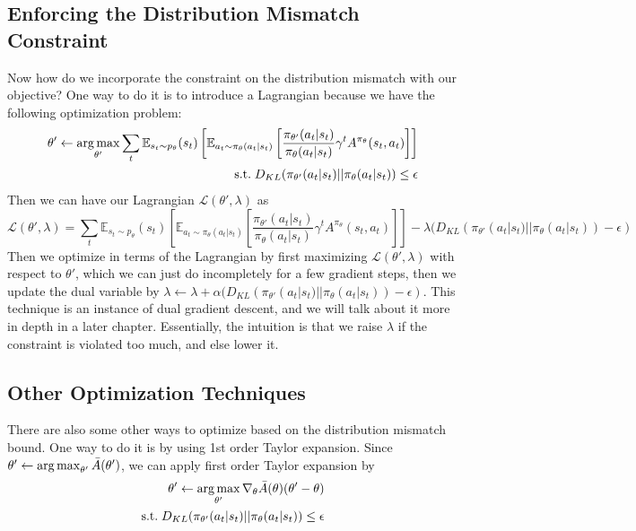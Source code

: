 \subsection{Enforcing the Distribution Mismatch Constraint}
Now how do we incorporate the constraint on the distribution mismatch with our objective? One way to do it is to introduce a Lagrangian because we have the following optimization problem:
\begin{equation}
\begin{aligned}
\theta'\leftarrow \operatorname*{arg\,max}_{\theta'} \sum_t \mathbb{E}_{s_t\sim p_{\theta}}(s_t)\left[\mathbb{E}_{a_t\sim \pi_\theta(a_t|s_t)}\left[\frac{\pi_{\theta'}(a_t|s_t)}{\pi_\theta(a_t|s_t)}\gamma^t A^{\pi_\theta}(s_t,a_t)\right]\right]\\
\mathrm{s.t. }\;D_{KL}(\pi_{\theta'}(a_t|s_t)||\pi_{\theta}(a_t|s_t))\leq \epsilon
    \end{aligned}
\end{equation}
Then we can have our Lagrangian $\mathcal{L}(\theta', \lambda)$ as
$$\mathcal{L}(\theta', \lambda) = \sum_t \mathbb{E}_{s_t\sim p_{\theta}}(s_t)\left[\mathbb{E}_{a_t\sim \pi_\theta(a_t|s_t)}\left[\frac{\pi_{\theta'}(a_t|s_t)}{\pi_\theta(a_t|s_t)}\gamma^t A^{\pi_\theta}(s_t,a_t)\right]\right] - \lambda(D_{KL}(\pi_{\theta'}(a_t|s_t)||\pi_{\theta}(a_t|s_t)) - \epsilon)$$
Then we optimize in terms of the Lagrangian by first maximizing $\mathcal{L}(\theta', \lambda)$ with respect to $\theta'$, which we can just do incompletely for a few gradient steps, then we update the dual variable by $\lambda \leftarrow \lambda + \alpha(D_{KL}(\pi_{\theta'}(a_t|s_t)||\pi_{\theta}(a_t|s_t)) - \epsilon)$. This technique is an instance of dual gradient descent, and we will talk about it more in depth in a later chapter. Essentially, the intuition is that we raise $\lambda$ if the constraint is violated too much, and else lower it. 

\subsection{Other Optimization Techniques}
There are also some other ways to optimize based on the distribution mismatch bound. One way to do it is by using 1st order Taylor expansion. Since $\theta' \leftarrow \operatorname*{arg\,max}_{\theta'}\bar{A}(\theta')$, we can apply first order Taylor expansion by
\begin{equation}
\begin{aligned}
\theta'\leftarrow \operatorname*{arg\,max}_{\theta'} \nabla_{\theta}\bar{A}(\theta)(\theta'-\theta)\\
\mathrm{s.t. }\;D_{KL}(\pi_{\theta'}(a_t|s_t)||\pi_{\theta}(a_t|s_t))\leq \epsilon
    \end{aligned}
\end{equation}

